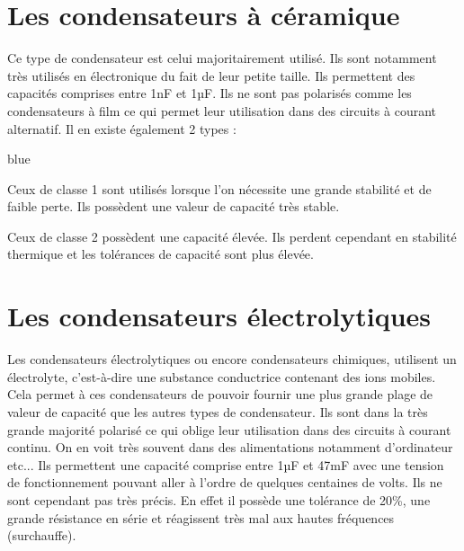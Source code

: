 \section{Les condensateurs à céramique}

Ce type de condensateur est celui majoritairement utilisé. Ils sont notamment très utilisés en électronique du fait de leur petite 
taille. Ils permettent des capacités comprises entre 1nF et 1µF. Ils ne sont pas polarisés comme les condensateurs à film ce qui 
permet leur utilisation dans des circuits à courant alternatif. Il en existe également 2 types :\\

\begin{items}{blue}{\Triangle}
    \item Ceux de classe 1 sont utilisés lorsque l’on nécessite une grande stabilité et de faible perte. Ils possèdent une valeur de capacité très stable.\\
    \item Ceux de classe 2 possèdent une capacité élevée. Ils perdent cependant en stabilité thermique et les tolérances de capacité sont plus élevée.
\end{items}


\newpage
\section{Les condensateurs électrolytiques}

Les condensateurs électrolytiques ou encore condensateurs chimiques, utilisent un électrolyte, c’est-à-dire une substance conductrice contenant des ions mobiles. Cela permet à ces condensateurs de pouvoir fournir une plus grande plage de valeur de capacité que les autres types de condensateur. Ils sont dans la très grande majorité polarisé ce qui oblige leur utilisation dans des circuits à courant continu. On en voit très souvent dans des alimentations notamment d'ordinateur etc... Ils permettent une capacité comprise entre 1µF et 47mF avec une tension de fonctionnement pouvant aller à l’ordre de quelques centaines de volts. Ils ne sont cependant pas très précis. En effet il possède une tolérance de 20\%, une grande résistance en série et réagissent très mal aux hautes fréquences (surchauffe). 





